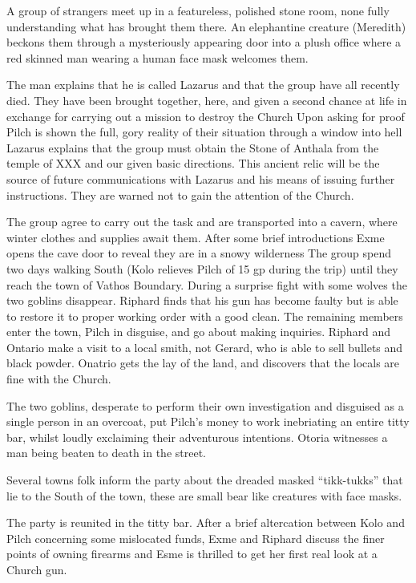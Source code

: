 \begin{multicols}{2}
A group of strangers meet up in a featureless, polished stone room, none fully understanding what has brought them there. An elephantine creature (Meredith) beckons them through a mysteriously appearing door into a plush office where a red skinned man wearing a human face mask welcomes them.\medskip

The man explains that he is called Lazarus and that the group have all recently died. They have been brought together, here, and given a second chance at life in exchange for carrying out a mission to destroy the Church Upon asking for proof Pilch is shown the full, gory reality of their situation through a window into hell Lazarus explains that the group must obtain the Stone of Anthala from the temple of XXX and our given basic directions. This ancient relic will be the source of future communications with Lazarus and his means of issuing further instructions. They are warned not to gain the attention of the Church.\medskip

The group agree to carry out the task and are transported into a cavern, where winter clothes and supplies await them. After some brief introductions Exme opens the cave door to reveal they are in a snowy wilderness The group spend two days walking South (Kolo relieves Pilch of 15 gp during the trip) until they reach the town of Vathos Boundary. During a surprise fight with some wolves the two goblins disappear. Riphard finds that his gun has become faulty but is able to restore it to proper working order with a good clean.\medskip
The remaining members enter the town, Pilch in disguise, and go about making inquiries. Riphard and Ontario make a visit to a local smith, not Gerard, who is able to sell bullets and black powder. Onatrio gets the lay of the land, and discovers that the locals are fine with the Church.\medskip

The two goblins, desperate to perform their own investigation and disguised as a single person in an overcoat, put Pilch’s money to work inebriating an entire titty bar, whilst loudly exclaiming their adventurous intentions. Otoria witnesses a man being beaten to death in the street.\medskip

Several towns folk inform the party about the dreaded masked “tikk-tukks” that lie to the South of the town, these are small bear like creatures with face masks.\medskip

The party is reunited in the titty bar. After a brief altercation between Kolo and Pilch concerning some mislocated funds, Exme and Riphard discuss the finer points of owning firearms and Esme is thrilled to get her first real look at a Church gun.\medskip


\end{multicols}
